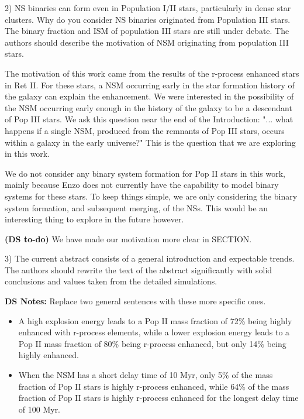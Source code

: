 \documentclass[11pt]{article}
\begin{document}
\begin{tcolorbox}[colback={lightgray}]
    2)      NS binaries can form even in Population I/II stars, particularly in dense star clusters. Why do you consider NS binaries originated from Population III stars. The binary fraction and ISM of population III stars are still under debate. The authors should describe the motivation of NSM originating from population III stars.
\end{tcolorbox}

The motivation of this work came from the results of the r-process enhanced stars in Ret II. For these stars, a NSM occurring early in the star formation history of the galaxy can explain the enhancement. We were interested in the possibility of the NSM occurring early enough in the history of the galaxy to be a descendant of Pop III stars. We ask this question near the end of the Introduction: "... what happens if a single NSM, produced from the remnants of Pop III stars, occurs within a galaxy in the early universe?" This is the question that we are exploring in this work.

We do not consider any binary system formation for Pop II stars in this work, mainly because Enzo does not currently have the capability to model binary systems for these stars. To keep things simple, we are only considering the binary system formation, and subsequent merging, of the NSs. This would be an interesting thing to explore in the future however.

\textbf{(DS to-do)} We have made our motivation more clear in SECTION.

\begin{tcolorbox}[colback={lightgray}]
    3)      The current abstract consists of a general introduction and expectable trends. The authors should rewrite the text of the abstract significantly with solid conclusions and values taken from the detailed simulations.
\end{tcolorbox}

\textbf{DS Notes:}
Replace two general sentences with these more specific ones.
\begin{itemize}
    \item A high explosion energy leads to a Pop II mass fraction of 72\% being highly enhanced with r-process elements, while a lower explosion energy leads to a Pop II mass fraction of 80\% being r-process enhanced, but only 14\% being highly enhanced.
    \item When the NSM has a short delay time of 10 Myr, only 5\% of the mass fraction of Pop II stars is highly r-process enhanced, while 64\% of the mass fraction of Pop II stars is highly r-process enhanced for the longest delay time of 100 Myr. 
\end{itemize}
\end{document}
